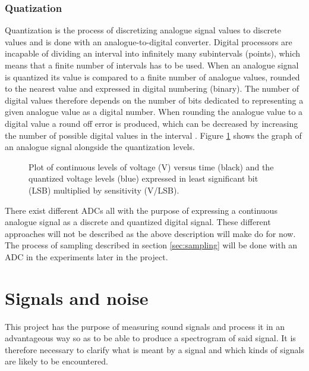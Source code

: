 \subsubsection{Quatization}
Quantization is the process of discretizing analogue signal values to discrete values and is done with an analogue-to-digital converter. Digital processors are incapable of dividing an interval into infinitely many subintervals (points), which means that a finite number of intervals has to be used. When an analogue signal is quantized its value is compared to a finite number of analogue values, rounded to the nearest value and expressed in digital numbering (binary). The number of digital values therefore depends on the number of bits dedicated to representing a given analogue value as a digital number. When rounding the analogue value to a digital value a round off error is produced, which can be decreased by increasing the number of possible digital values in the interval \cite{pelgrom}. Figure \ref{fig:quant} shows the graph of an analogue signal alongside the quantization levels.
\begin{figure}[H]
\centering
{}
\caption{Plot of continuous levels of voltage (V) versus time (black) and the quantized voltage levels (blue) expressed in least significant bit (LSB) multiplied by sensitivity (V/LSB).}
\label{fig:quant}
\end{figure}

There exist different ADCs \cite{pelgrom} all with the purpose of expressing a continuous analogue signal as a discrete and quantized digital signal. These different approaches will  not be described as the above description will make do for now. The process of sampling described in section \ref{sec:sampling} will be done with an ADC in the experiments later in the project.

\section{Signals and noise}
This project has the purpose of measuring sound signals and process it in an advantageous way so as to be able to produce a spectrogram of said signal. It is therefore necessary to clarify what is meant by a signal and which kinds of signals are likely to be encountered.

